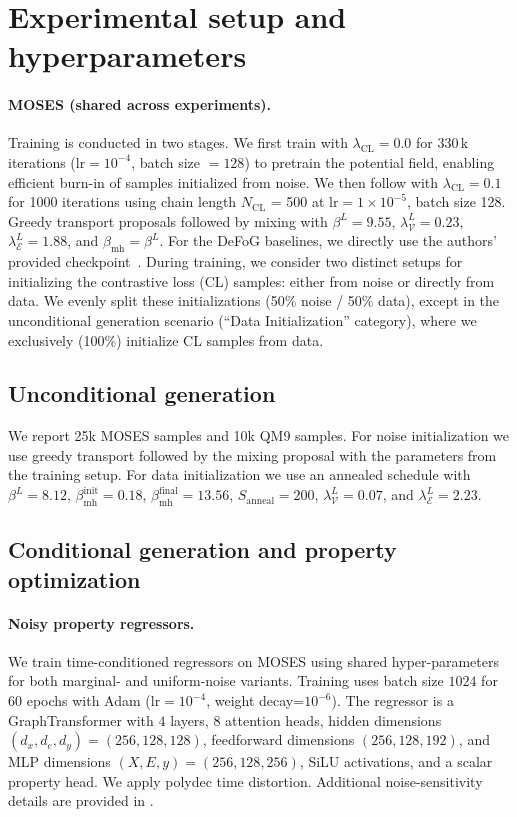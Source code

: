 \section{Experimental setup and hyperparameters}
\label{app:exp-setup}
\paragraph{MOSES (shared across experiments).}
Training is conducted in two stages. We first train with $\lambda_{\mathrm{CL}}=0.0$ for $330\,\text{k}$ iterations ($\text{lr}=10^{-4}$, batch size $=128$) to pretrain the potential field, enabling efficient burn-in of samples initialized from noise. We then follow with
$\lambda_{\mathrm{CL}}=0.1$ for 1000 iterations using chain length $N_{\mathrm{CL}}$ = 500 at
$\text{lr}=1\times 10^{-5}$, batch size 128. Greedy transport proposals followed by mixing with $\beta^L=9.55$, $\lambda_{\mathcal{V}}^L=0.23$, $\lambda_{\mathcal{E}}^L=1.88$,
and $\beta_{\mathrm{mh}}=\beta^L$. For the DeFoG baselines, we directly use the authors' provided checkpoint~\citep{qinmadeira2024defog}. During training, we consider two distinct setups for initializing the contrastive loss (CL) samples: either from noise or directly from data. We evenly split these initializations (50\% noise / 50\% data), except in the unconditional generation scenario (``Data Initialization'' category), where we exclusively (100\%) initialize CL samples from data.


\subsection{Unconditional generation}
We report 25k MOSES samples and 10k QM9 samples. For noise initialization we use greedy transport
followed by the mixing proposal with the parameters from the training setup. For data initialization we
use an annealed schedule with $\beta^{L}=8.12$, $\beta_{\mathrm{mh}}^{\mathrm{init}}=0.18$,
$\beta_{\mathrm{mh}}^{\mathrm{final}}=13.56$, $S_{\mathrm{anneal}}=200$, $\lambda_{\mathcal{V}}^L=0.07$,
and $\lambda_{\mathcal{E}}^L=2.23$.

\subsection{Conditional generation and property optimization}
\paragraph{Noisy property regressors.}
We train time-conditioned regressors on MOSES using shared hyper-parameters for both marginal- and uniform-noise variants. Training uses batch size $1024$ for $60$ epochs with Adam ($\text{lr}=10^{-4}$, weight decay=$10^{-6}$). The regressor is a GraphTransformer with $4$ layers, $8$ attention heads, hidden dimensions $(d_x,d_e,d_y)=(256,128,128)$, feedforward dimensions $(256,128,192)$, and MLP dimensions $(X,E,y)=(256,128,256)$, SiLU activations, and a scalar property head. We apply polydec time distortion. Additional noise-sensitivity details are provided in .


